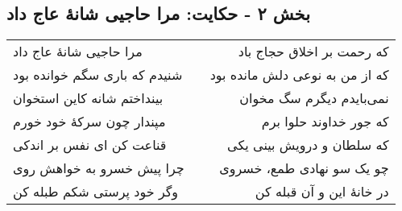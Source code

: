\begin{center}
\section*{بخش ۲ - حکایت: مرا حاجیی شانهٔ عاج داد}
\label{sec:002}
\begin{longtable}{l p{0.5cm} r}
مرا حاجیی شانهٔ عاج داد
&&
که رحمت بر اخلاق حجاج باد
\\
شنیدم که باری سگم خوانده بود
&&
که از من به نوعی دلش مانده بود
\\
بینداختم شانه کاین استخوان
&&
نمی‌بایدم دیگرم سگ مخوان
\\
مپندار چون سرکهٔ خود خورم
&&
که جور خداوند حلوا برم
\\
قناعت کن ای نفس بر اندکی
&&
که سلطان و درویش بینی یکی
\\
چرا پیش خسرو به خواهش روی
&&
چو یک سو نهادی طمع، خسروی
\\
وگر خود پرستی شکم طبله کن
&&
در خانهٔ این و آن قبله کن
\\
\end{longtable}
\end{center}

